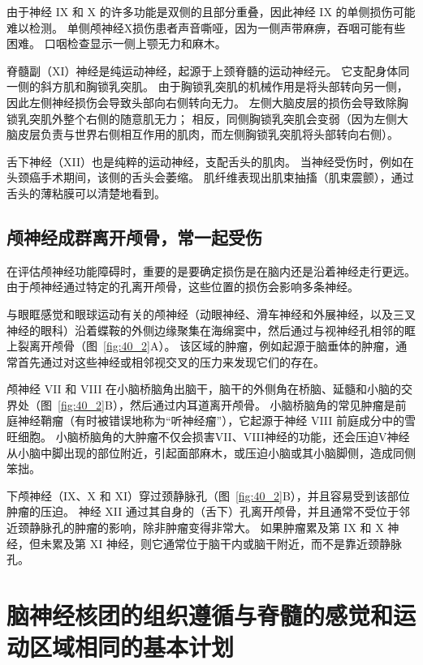 由于神经 IX 和 X 的许多功能是双侧的且部分重叠，因此神经 IX 的单侧损伤可能难以检测。
单侧颅神经X损伤患者声音嘶哑，因为一侧声带麻痹，吞咽可能有些困难。
口咽检查显示一侧上颚无力和麻木。


脊髓副（XI）神经是纯运动神经，起源于上颈脊髓的运动神经元。
它支配身体同一侧的斜方肌和胸锁乳突肌。
由于胸锁乳突肌的机械作用是将头部转向另一侧，因此左侧神经损伤会导致头部向右侧转向无力。
左侧大脑皮层的损伤会导致除胸锁乳突肌外整个右侧的随意肌无力；
相反，同侧胸锁乳突肌会变弱（因为左侧大脑皮层负责与世界右侧相互作用的肌肉，而左侧胸锁乳突肌将头部转向右侧）。


舌下神经（XII）也是纯粹的运动神经，支配舌头的肌肉。
当神经受伤时，例如在头颈癌手术期间，该侧的舌头会萎缩。
肌纤维表现出肌束抽搐（肌束震颤），通过舌头的薄粘膜可以清楚地看到。



\subsection{颅神经成群离开颅骨，常一起受伤}

在评估颅神经功能障碍时，重要的是要确定损伤是在脑内还是沿着神经走行更远。
由于颅神经通过特定的孔离开颅骨，这些位置的损伤会影响多条神经。


与眼眶感觉和眼球运动有关的颅神经（动眼神经、滑车神经和外展神经，以及三叉神经的眼科）沿着蝶鞍的外侧边缘聚集在海绵窦中，然后通过与视神经孔相邻的眶上裂离开颅骨（图~\ref{fig:40_2}A）。
该区域的肿瘤，例如起源于脑垂体的肿瘤，通常首先通过对这些神经或相邻视交叉的压力来发现它们的存在。


颅神经 VII 和 VIII 在小脑桥脑角出脑干，脑干的外侧角在桥脑、延髓和小脑的交界处（图~\ref{fig:40_2}B），然后通过内耳道离开颅骨。
小脑桥脑角的常见肿瘤是前庭神经鞘瘤（有时被错误地称为“听神经瘤”），它起源于神经 VIII 前庭成分中的雪旺细胞。
小脑桥脑角的大肿瘤不仅会损害VII、VIII神经的功能，还会压迫V神经从小脑中脚出现的部位附近，引起面部麻木，或压迫小脑或其小脑脚侧，造成同侧笨拙。


下颅神经（IX、X 和 XI）穿过颈静脉孔（图~\ref{fig:40_2}B），并且容易受到该部位肿瘤的压迫。
神经 XII 通过其自身的（舌下）孔离开颅骨，并且通常不受位于邻近颈静脉孔的肿瘤的影响，除非肿瘤变得非常大。
如果肿瘤累及第 IX 和 X 神经，但未累及第 XI 神经，则它通常位于脑干内或脑干附近，而不是靠近颈静脉孔。



\section{脑神经核团的组织遵循与脊髓的感觉和运动区域相同的基本计划}

